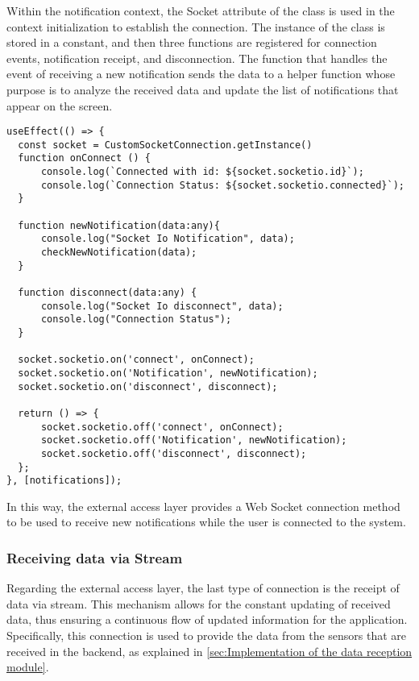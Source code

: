 Within the notification context, the Socket attribute of the class is used in the context initialization to establish the connection. The instance of the class is stored in a constant, and then three functions are registered for connection events, notification receipt, and disconnection. The function that handles the event of receiving a new notification sends the data to a helper function whose purpose is to analyze the received data and update the list of notifications that appear on the screen.

\begin{Verbatim}[fontsize=\small, baselinestretch=0.8]
useEffect(() => {
  const socket = CustomSocketConnection.getInstance()
  function onConnect () {
      console.log(`Connected with id: ${socket.socketio.id}`);
      console.log(`Connection Status: ${socket.socketio.connected}`);
  }

  function newNotification(data:any){
      console.log("Socket Io Notification", data);
      checkNewNotification(data);
  }

  function disconnect(data:any) {
      console.log("Socket Io disconnect", data);
      console.log("Connection Status");
  }

  socket.socketio.on('connect', onConnect);
  socket.socketio.on('Notification', newNotification);
  socket.socketio.on('disconnect', disconnect);

  return () => {
      socket.socketio.off('connect', onConnect);
      socket.socketio.off('Notification', newNotification);
      socket.socketio.off('disconnect', disconnect);
  };
}, [notifications]);
\end{Verbatim}

In this way, the external access layer provides a Web Socket connection method to be used to receive new notifications while the user is connected to the system.

\subsubsection{Receiving data via Stream}\label{subsec:streamData}

Regarding the external access layer, the last type of connection is the receipt of data via stream. This mechanism allows for the constant updating of received data, thus ensuring a continuous flow of updated information for the application. Specifically, this connection is used to provide the data from the sensors that are received in the backend, as explained in \ref{sec:Implementation of the data reception module}.

